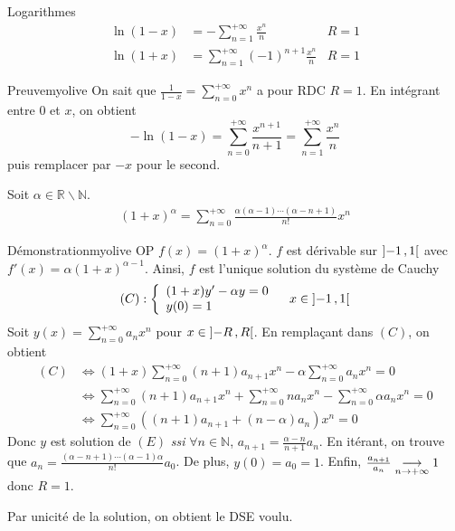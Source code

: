     \begin{prop}{Logarithmes}{}
        \begin{align*}
            \ln(1-x) &= - \sum_{n=1}^{+\infty} \frac{x^n}{n} & R = 1 \\
            \ln(1+x) &= \sum_{n=1}^{+\infty} (-1)^{n+1} \frac{x^n}{n} & R = 1 
        \end{align*}
    \end{prop}

    \begin{demo}{Preuve}{myolive}
        On sait que $\frac{1}{1-x} = \sum_{n=0}^{+\infty} x^n$ a pour RDC $R = 1$. En intégrant entre $0$ et $x$, on obtient 
        \[ -\ln(1-x) = \sum_{n=0}^{+\infty} \frac{x^{n+1}}{n+1} = \sum_{n=1}^{+\infty} \frac{x^n}{n} \]  
        puis remplacer par $-x$ pour le second.
    \end{demo}

    \begin{prop}{}{}
        Soit $\alpha \in \mathbb{R} \backslash \mathbb{N}$.
        \begin{align*}
            (1+x)^{\alpha} = \sum_{n=0}^{+\infty} \frac{\alpha(\alpha-1)\cdots(\alpha-n+1)}{n!} x^n 
        \end{align*}
    \end{prop}

    \begin{demo}{Démonstration}{myolive}
        OP $f(x) = (1+x)^{\alpha}$. $f$ est dérivable sur $\left] -1 \, , 1 \right[$ avec $f'(x) = \alpha(1+x)^{\alpha - 1}$. Ainsi, $f$ est l’unique solution du système de Cauchy 
        \[ (C) : \et{(1+x)y' - \alpha y = 0}{y(0) = 1} \quad x \in \intervalleOO{-1}{1} \]    
        Soit $y(x) = \sum_{n=0}^{+\infty} a_n x^n$ pour $x \in \left] -R \, , R \right[$. En remplaçant dans $(C)$, on obtient 
        \begin{align*}
            (C)
            &\iff (1+x) \sum_{n=0}^{+\infty} (n+1) a_{n+1} x^n - \alpha \sum_{n=0}^{+\infty} a_n x^n = 0 \\
            &\iff \sum_{n=0}^{+\infty} (n+1) a_{n+1} x^n + \sum_{n=0}^{+\infty} n a_n x^n - \sum_{n=0}^{+\infty} \alpha a_n x^n = 0 \\
            &\iff \sum_{n=0}^{+\infty} \left((n+1)a_{n+1} + (n-\alpha) a_n\right)x^n = 0 
        \end{align*}
        Donc $y$ est solution de $(E)$ \textit{ssi} $\forall n \in \mathbb{N}$, $a_{n+1} = \frac{\alpha - n}{n+1} a_n$. En itérant, on trouve que $a_n = \frac{(\alpha - n + 1) \cdots (\alpha - 1) \alpha}{n!} a_0$. De plus, $y(0) = a_0 = 1$. Enfin, $\frac{a_{n+1}}{a_n} \underset{n \rightarrow +\infty}{\longrightarrow} 1$ donc $R = 1$.

        Par unicité de la solution, on obtient le DSE voulu.
    \end{demo}

